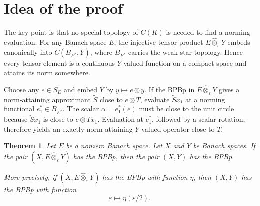 \documentclass[11pt]{article}
\newtheorem{theorem}{Theorem}
\newcommand{\eps}{\varepsilon}
\newcommand{\ot}{\widehat{\otimes}_{\varepsilon}}
\begin{document}
\section*{Idea of the proof}

The key point is that no special topology of $C(K)$ is needed to find a
norming evaluation.  For any Banach space $E$, the injective tensor product
$E\ot Y$ embeds canonically into $C(B_{E^\ast},Y)$, where $B_{E^\ast}$ carries
the weak-star topology.  Hence every tensor element is a continuous
$Y$-valued function on a compact space and attains its norm somewhere.

Choose any $e\in S_E$ and embed $Y$ by $y\mapsto e\otimes y$.  If the BPBp in
$E\ot Y$ gives a norm-attaining approximant $\widetilde S$ close to
$e\otimes T$, evaluate $\widetilde Sx_1$ at a norming functional
$e_1^\ast\in B_{E^\ast}$.  The scalar $\alpha=e_1^\ast(e)$ must be close to
the unit circle because $\widetilde Sx_1$ is close to
$e\otimes Tx_1$.  Evaluation at $e_1^\ast$, followed by a scalar rotation,
therefore yields an exactly norm-attaining $Y$-valued operator close to $T$.

\begin{theorem}
Let $E$ be a nonzero Banach space.  Let $X$ and $Y$ be Banach spaces.  If the
pair $(X,E\ot Y)$ has the BPBp, then the pair $(X,Y)$ has the BPBp.

More precisely, if $(X,E\ot Y)$ has the BPBp with function $\eta$, then
$(X,Y)$ has the BPBp with function
\[
 \eps\longmapsto \eta(\eps/2).
\]
\end{theorem}
\end{document}
